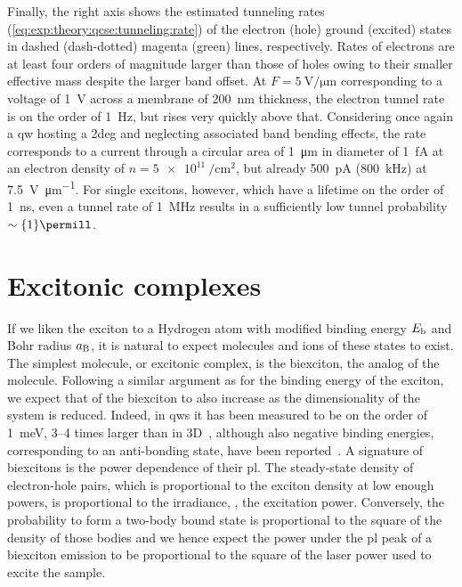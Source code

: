 Finally, the right axis shows the estimated tunneling rates (\cref{eq:exp:theory:qcse:tunneling:rate}) of the electron (hole) ground (excited) states in dashed (dash-dotted) magenta (green) lines, respectively.
Rates of electrons are at least four orders of magnitude larger than those of holes owing to their smaller effective mass despite the larger band offset.
At $F=\qty{5}{\volt\per\micro\meter}$ corresponding to a voltage of \qty{1}{\volt} across a membrane of \qty{200}{\nano\meter} thickness, the electron tunnel rate is on the order of \qty{1}{\hertz}, but rises very quickly above that.
Considering once again a \gls{qw} hosting a \gls{2deg} and neglecting associated band bending effects, the rate corresponds to a current through a circular area of \qty{1}{\micro\meter} in diameter of \qty{1}{\femto\ampere} at an electron density of $n = \qty{5e11}{\per\centi\meter\squared}$, but already \qty{500}{\pico\ampere} (\qty{800}{\kilo\hertz}) at \qty{7.5}{\volt\per\micro\meter}.
For single excitons, however, which have a lifetime on the order of \qty{1}{\nano\second}, even a tunnel rate of \qty{1}{\mega\hertz} results in a sufficiently low tunnel probability $\sim\qty{1}{\permill}$.

\section{Excitonic complexes}\label{sec:exp:theory:complexes}
If we liken the exciton to a Hydrogen atom with modified binding energy $E_{\mathrm{b}}$ and Bohr radius $a_{\mathrm{B}}$, it is natural to expect molecules and ions of these states to exist.
The simplest molecule, or excitonic complex, is the biexciton, the analog of the  molecule.
Following a similar argument as for the binding energy of the exciton, we expect that of the biexciton to also increase as the dimensionality of the system is reduced.
Indeed, in \glspl{qw} it has been measured to be on the order of \qty{1}{\milli\electronvolt}, \numrange{3}{4} times larger than in 3D~\cite{Miller1985a}, although also negative binding energies, corresponding to an anti-bonding state, have been reported~\cite{Kako2004,Dialynas2008,Amloy2011}.
A signature of biexcitons is the power dependence of their \gls{pl}.
The steady-state density of electron-hole pairs, which is proportional to the exciton density at low enough powers, is proportional to the irradiance, \ie, the excitation power.
Conversely, the probability to form a two-body bound state is proportional to the square of the density of those bodies and we hence expect the power under the \gls{pl} peak of a biexciton emission to be proportional to the square of the laser power used to excite the sample.

